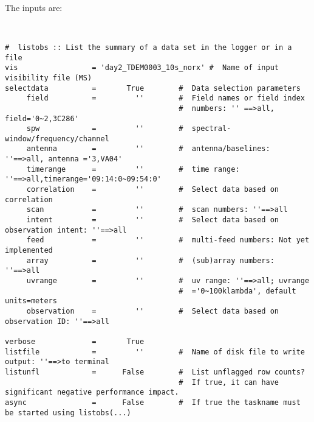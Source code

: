 The inputs are:
\small
\begin{verbatim}


#  listobs :: List the summary of a data set in the logger or in a file
vis                 = 'day2_TDEM0003_10s_norx' #  Name of input visibility file (MS)
selectdata          =       True        #  Data selection parameters
     field          =         ''        #  Field names or field index
                                        #  numbers: '' ==>all, field='0~2,3C286'
     spw            =         ''        #  spectral-window/frequency/channel
     antenna        =         ''        #  antenna/baselines: ''==>all, antenna ='3,VA04'
     timerange      =         ''        #  time range: ''==>all,timerange='09:14:0~09:54:0'
     correlation    =         ''        #  Select data based on correlation
     scan           =         ''        #  scan numbers: ''==>all
     intent         =         ''        #  Select data based on observation intent: ''==>all
     feed           =         ''        #  multi-feed numbers: Not yet implemented
     array          =         ''        #  (sub)array numbers: ''==>all
     uvrange        =         ''        #  uv range: ''==>all; uvrange
                                        #  ='0~100klambda', default units=meters
     observation    =         ''        #  Select data based on observation ID: ''==>all

verbose             =       True        
listfile            =         ''        #  Name of disk file to write output: ''==>to terminal
listunfl            =      False        #  List unflagged row counts?
                                        #  If true, it can have significant negative performance impact.
async               =      False        #  If true the taskname must be started using listobs(...)

\end{verbatim}
\normalsize

